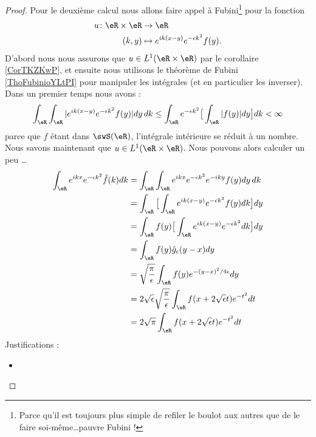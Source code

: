 \begin{proof}
    Pour le deuxième calcul nous allons faire appel à Fubini\footnote{Parce qu'il est toujours plus simple de refiler le boulot aux autres que de le faire soi-même\ldots pauvre Fubini !} pour la fonction 
    \begin{equation}
        \begin{aligned}
            u\colon \eR\times \eR&\to \eR \\
            (k,y)&\mapsto  e^{ik(x-y)} e^{-\epsilon k^2}f(y). 
        \end{aligned}
    \end{equation}
    D'abord nous nous assurons que \( u\in L^1(\eR\times \eR)\) par le corollaire \ref{CorTKZKwP}, et ensuite nous utilisons le théorème de Fubini \ref{ThoFubinioYLtPI} pour manipuler les intégrales (et en particulier les inverser). Dans un premier temps nous avons :
    \begin{equation}
        \int_{\eR}\int_{\eR}|  e^{ik(x-y)} e^{-\epsilon k^2} f(y) |dy\,dk\leq \int_{\eR} e^{-\epsilon k^2} \big[  \int_{\eR}| f(y) |   dy \big] dk<\infty
    \end{equation}
    parce que $f$ étant dans \( \swS(\eR)\), l'intégrale intérieure se réduit à un nombre. Nous savons maintenant que \( u\in L^1(\eR\times \eR)\). Nous pouvons alors calculer un peu \ldots
    \begin{subequations}
        \begin{align}
            \int_{\eR} e^{ikx} e^{-\epsilon k^2}\hat f(k)dk&=\int_{\eR}\int_{\eR} e^{ikx} e^{-\epsilon k^2} e^{-iky}f(y)dy\,dk\\
            &=\int_{\eR}\big[ \int_{\eR} e^{ik(x-y)} e^{-\epsilon k^2}f(y)dk \big]dy\\
            &=\int_{\eR}f(y)\big[   \int_{\eR} e^{ik(x-y)} e^{-\epsilon k^2}dk  \big]dy\\
            &=\int_{\eR} f(y)\hat g_{\epsilon}(y-x)dy\\
            &=\sqrt{ \frac{ \pi }{ \epsilon } }\int_{\eR}f(y) e^{-(y-x)^2/4\epsilon}dy\\
            &=2\sqrt{ \epsilon }\sqrt{ \frac{ \pi }{ \epsilon } }\int_{\eR}f(x+2\sqrt{ \epsilon }t) e^{-t^2}dt\\
            &=2\sqrt{ \pi }\int_{\eR}f(x+2\sqrt{ \epsilon }t) e^{-t^2}dt\\
        \end{align}
    \end{subequations}
    Justifications  :
    \begin{itemize}
        \item 

\end{itemize}
\end{proof}
